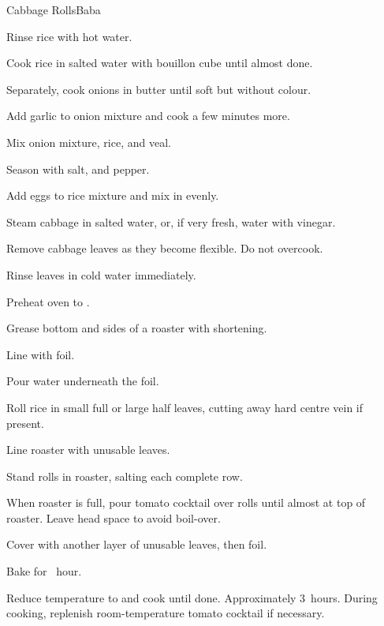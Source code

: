 \begin{recipe}{Cabbage Rolls}{Baba}{}
\begin{directions}
\item Rinse rice with hot water.
\item Cook rice in salted water with bouillon cube until almost done.
\item Separately, cook onions in butter until soft but without colour.
\item Add garlic to onion mixture and cook a few minutes more.
\item Mix onion mixture, rice, and veal.
\item Season with salt, and pepper.
\item Add eggs to rice mixture and mix in evenly.
\item Steam cabbage in salted water, or, if very fresh, water with vinegar.
\item Remove cabbage leaves as they become flexible. Do not overcook.
\item Rinse leaves in cold water immediately.
\item Preheat oven to .
\item Grease bottom and sides of a roaster with shortening.
\item Line with foil.
\item Pour water underneath the foil.
\item Roll rice in small full or large half leaves, cutting away hard centre vein if present.
\item Line roaster with unusable leaves.
\item Stand rolls in roaster, salting each complete row.
\item When roaster is full, pour tomato cocktail over rolls until almost at top of roaster. Leave head space to avoid boil-over.
\item Cover with another layer of unusable leaves, then foil.
\item Bake for \half~hour.
\item Reduce temperature to  and cook until done. Approximately 3~hours. During cooking, replenish room-temperature tomato cocktail if necessary.
\end{directions}

\end{recipe}
